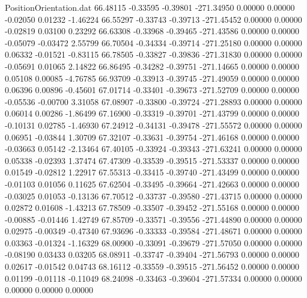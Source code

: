 \begin{filecontents}{PositionOrientation.dat}
  66.48115   -0.33595   -0.39801  -271.34950    0.00000    0.00000   -0.02050    0.01232   -1.46224
  66.55297   -0.33743   -0.39713  -271.45452    0.00000    0.00000   -0.02819    0.03100    0.23292
  66.63308   -0.33968   -0.39465  -271.43586    0.00000    0.00000   -0.05079   -0.03472    2.55799
  66.70504   -0.34334   -0.39714  -271.25180    0.00000    0.00000    0.06332   -0.01521   -0.83115
  66.78505   -0.33827   -0.39836  -271.31830    0.00000    0.00000   -0.05691    0.01065    2.14822
  66.86495   -0.34282   -0.39751  -271.14665    0.00000    0.00000    0.05108    0.00085   -4.76785
  66.93709   -0.33913   -0.39745  -271.49059    0.00000    0.00000    0.06396    0.00896   -0.45601
  67.01714   -0.33401   -0.39673  -271.52709    0.00000    0.00000   -0.05536   -0.00700    3.31058
  67.08907   -0.33800   -0.39724  -271.28893    0.00000    0.00000    0.06014    0.00286   -1.86499
  67.16900   -0.33319   -0.39701  -271.43799    0.00000    0.00000   -0.10131    0.02785   -1.46930
  67.24912   -0.34131   -0.39478  -271.55572    0.00000    0.00000    0.06951   -0.03844    1.30709
  67.32107   -0.33631   -0.39754  -271.46168    0.00000    0.00000   -0.03663    0.05142   -2.13464
  67.40105   -0.33924   -0.39343  -271.63241    0.00000    0.00000    0.05338   -0.02393    1.37474
  67.47309   -0.33539   -0.39515  -271.53337    0.00000    0.00000    0.01549   -0.02812    1.22917
  67.55313   -0.33415   -0.39740  -271.43499    0.00000    0.00000   -0.01103    0.01056    0.11625
  67.62504   -0.33495   -0.39664  -271.42663    0.00000    0.00000   -0.03025    0.01053   -0.13136
  67.70512   -0.33737   -0.39580  -271.43715    0.00000    0.00000    0.02872    0.01608   -1.43213
  67.78509   -0.33507   -0.39452  -271.55168    0.00000    0.00000   -0.00885   -0.01446    1.42749
  67.85709   -0.33571   -0.39556  -271.44890    0.00000    0.00000    0.02975   -0.00349   -0.47340
  67.93696   -0.33333   -0.39584  -271.48671    0.00000    0.00000    0.03363   -0.01324   -1.16329
  68.00900   -0.33091   -0.39679  -271.57050    0.00000    0.00000   -0.08190    0.03433    0.03205
  68.08911   -0.33747   -0.39404  -271.56793    0.00000    0.00000    0.02617   -0.01542    0.04743
  68.16112   -0.33559   -0.39515  -271.56452    0.00000    0.00000    0.01199   -0.01118   -0.11049
  68.24098   -0.33463   -0.39604  -271.57334    0.00000    0.00000    0.00000    0.00000    0.00000
\end{filecontents}
